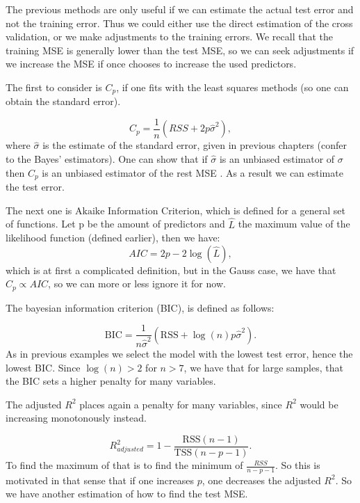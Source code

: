 \documentclass{article}
\begin{document}
The previous methods are only useful if we can estimate the actual test error and not the training error. Thus we could either use the direct estimation of the cross validation, or we make adjustments to the training errors. 
We recall that the training MSE is generally lower than the test MSE, so we can seek adjustments if we increase the MSE if once chooses to increase the used predictors.

The first to consider is $C_p$, if one fits with the least squares methods (so one can obtain the standard error).

\begin{equation}
C_p = \frac{1}{n}(RSS+2p\hat{\sigma}^2),
\end{equation}
where $\hat{\sigma}$ is the estimate of the standard error, given in previous chapters (confer to the Bayes' estimators). One can show that if $\hat{\sigma}$ is an unbiased estimator of $\sigma$ then $C_p$ is an unbiased estimator of the rest MSE \cite{degroot2013probability}. As a result we can estimate the test error. 

The next one is $\text{Akaike Information Criterion}$, which is defined for a general set of functions. Let p be the amount of predictors and $\hat{L}$ the maximum value of the likelihood function (defined earlier), then we have:
\begin{equation}
    AIC = 2p -2\log (\hat{L}),
\end{equation}
which is at first a complicated definition, but in the Gauss case, we have that $C_p \propto AIC$, so we can more or less ignore it for now. 

The bayesian information criterion (BIC), is defined as follows:

\begin{equation}
    \text{BIC} = \frac{1}{n\hat{\sigma}^2} (\text{RSS} + \log(n) p \hat{\sigma}^2).
\end{equation}
As in previous examples we select the model with the lowest test error, hence the lowest BIC. Since $\log(n)>2$ for $n>7$, we have that for large samples, that the BIC sets a higher penalty for many variables. 

The adjusted $R^2$ places again a penalty for many variables, since $R^2$ would be increasing monotonously instead. 

\begin{equation}
    R^2_{adjusted} = 1- \frac{\text{RSS} (n-1)}{\text{TSS} (n-p-1)}.
\end{equation}
 To find the maximum of that is to find the minimum of $\frac{RSS}{n-p-1}$. So this is motivated in that sense that if one increases $p$, one decreases the adjusted $R^2$. So we have another estimation of how to find the test MSE.
 
\end{document}
